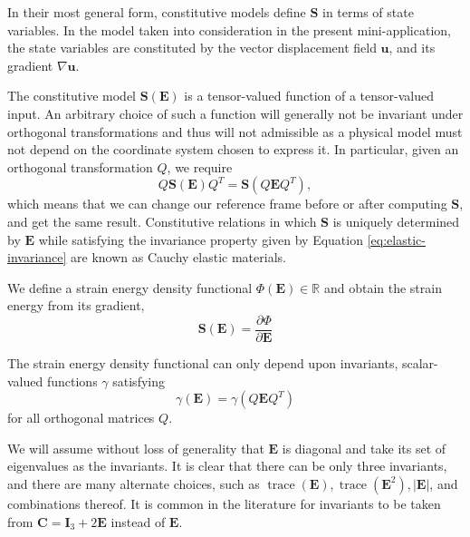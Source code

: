 In their most general form, constitutive models define $\mathbf S$ in terms of state variables.
In the model taken into consideration in the present mini-application, the state variables are constituted by the vector displacement field $\mathbf u$, and its gradient $\nabla \mathbf u$.

The constitutive model $\mathbf S \left( \mathbf E \right)$ is a tensor-valued function of a tensor-valued input.
An arbitrary choice of such a function will generally not be invariant under orthogonal transformations and thus will not admissible as a physical model must not depend on the coordinate system chosen to express it.
In particular, given an orthogonal transformation $Q$, we require
\begin{equation}
   Q \mathbf S \left( \mathbf E \right) Q^T = \mathbf S \left( Q \mathbf E Q^T \right),
   \label{eq:elastic-invariance}
\end{equation}
which means that we can change our reference frame before or after computing $\mathbf S$, and get the same result.
Constitutive relations in which $\mathbf S$ is uniquely determined by $\mathbf E$ while satisfying the invariance property given by Equation \ref{eq:elastic-invariance} are known as Cauchy elastic materials.

We define a strain energy density functional $\Phi \left( \mathbf E \right) \in \mathbb{R}$ and obtain the strain energy from its gradient,
\begin{equation}
\mathbf S \left( \mathbf E \right) = \frac{\partial \Phi}{\partial \mathbf E}
\label{eq:strain-energy-grad}
\end{equation}

The strain energy density functional can only depend upon invariants, scalar-valued functions $\gamma$ satisfying
\begin{equation}
\gamma \left( \mathbf E \right) = \gamma \left( Q \mathbf{E} Q^T \right)
\end{equation}
for all orthogonal matrices $Q$.

We will assume without loss of generality that $\mathbf E$ is diagonal and take its set of eigenvalues as the invariants.
It is clear that there can be only three invariants, and there are many alternate choices, such as $\operatorname{trace}(\mathbf E), \operatorname{trace}(\mathbf E^2), \lvert \mathbf E \rvert$, and combinations thereof.
It is common in the literature for invariants to be taken from $\mathbf C = \mathbf I_3 + 2 \mathbf E$ instead of $\mathbf E$.

